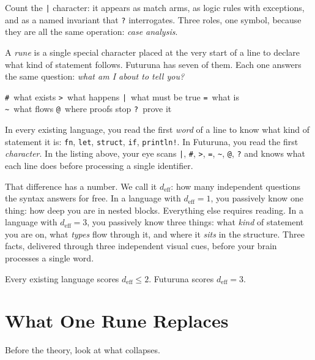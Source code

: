 \documentclass[11pt,a4paper]{article}
\newcommand{\deff}{d_{\mathrm{eff}}}
\begin{document}
Count the \texttt{|} character: it appears as match arms, as logic rules with exceptions, and as a named invariant that \texttt{?} interrogates. Three roles, one symbol, because they are all the same operation: \emph{case analysis}.

A \emph{rune} is a single special character placed at the very start of a line to declare what kind of statement follows. Futuruna has seven of them. Each one answers the same question: \emph{what am I about to tell you?}

\begin{center}
\texttt{\#}~what exists \quad \texttt{>}~what happens \quad \texttt{|}~what must be true \quad \texttt{=}~what is\\[3pt]
\texttt{\textasciitilde}~what flows \quad \texttt{@}~where proofs stop \quad \texttt{?}~prove it
\end{center}

In every existing language, you read the first \emph{word} of a line to know what kind of statement it is: \texttt{fn}, \texttt{let}, \texttt{struct}, \texttt{if}, \texttt{println!}. In Futuruna, you read the first \emph{character}. In the listing above, your eye scans \texttt{|}, \texttt{\#}, \texttt{>}, \texttt{=}, \texttt{\textasciitilde}, \texttt{@}, \texttt{?} and knows what each line does before processing a single identifier.

That difference has a number. We call it $\deff$: how many independent questions the syntax answers for free. In a language with $\deff = 1$, you passively know one thing: how deep you are in nested blocks. Everything else requires reading. In a language with $\deff = 3$, you passively know three things: what \emph{kind} of statement you are on, what \emph{types} flow through it, and where it \emph{sits} in the structure. Three facts, delivered through three independent visual cues, before your brain processes a single word.

Every existing language scores $\deff \leq 2$. Futuruna scores $\deff = 3$.

\section{What One Rune Replaces}

Before the theory, look at what collapses.
\end{document}

